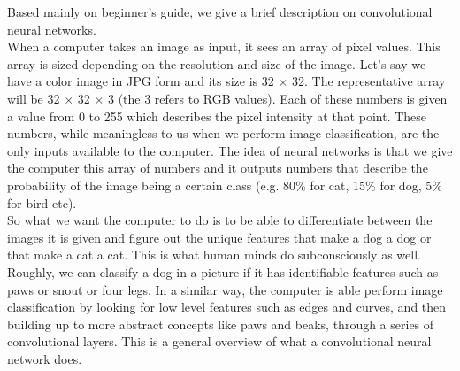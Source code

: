 \documentclass[12pt,a4paper,table,dvipsnames,tikz]{report}
\newcommand{\acronym}{\MakeUppercase}
\begin{document}
	Based mainly on \citet{Deshpande_guide} beginner's guide, we give a brief 
	description on convolutional neural networks.
	\\
	
	When a computer takes an image as input, it sees an array of pixel values. This 
	array is sized depending on the resolution and size of the image. Let's say we 
	have a color image in \acronym{jpg} form and its size is 32 $\times$ 32. The 
	representative array will be 32 $\times$ 32 $\times$ 3 (the 3 refers to \acronym{rgb} 
	values). Each of these numbers is given a value from 0 to 255 which describes the 
	pixel intensity at that point. These numbers, while meaningless to us when we 
	perform image classification, are the only inputs available to the computer. The 
	idea of neural networks is that we give the computer this array of numbers and 
	it outputs numbers that describe the probability of the image being a certain 
	class (e.g. 80\% for cat, 15\% for dog, 5\% for bird etc).
	\\
	
	So what we want the computer to do is to be able to differentiate between the 
	images it is given and figure out the unique features that make a dog a dog or 
	that make a cat a cat. This is what human minds do subconsciously as well. Roughly,
	we can classify a dog in a picture if it has identifiable features such as paws or 
	snout or four legs. In a similar way, the computer is able perform image 
	classification by looking for low level features such as edges and curves, and 
	then building up to more abstract concepts like paws and beaks, through a series 
	of convolutional layers. This is a general overview of what a convolutional neural 
	network does.
	\\
	
\end{document}
